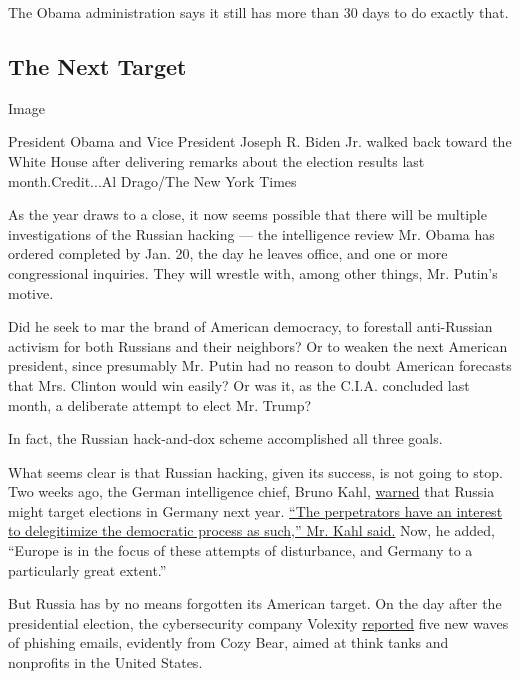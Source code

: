 The Obama administration says it still has more than 30 days to do
exactly that.

\hypertarget{the-next-target}{%
\subsection{The Next Target}\label{the-next-target}}

Image

President Obama and Vice President Joseph R. Biden Jr. walked back
toward the White House after delivering remarks about the election
results last month.Credit...Al Drago/The New York Times

As the year draws to a close, it now seems possible that there will be
multiple investigations of the Russian hacking --- the intelligence
review Mr. Obama has ordered completed by Jan. 20, the day he leaves
office, and one or more congressional inquiries. They will wrestle with,
among other things, Mr. Putin's motive.

Did he seek to mar the brand of American democracy, to forestall
anti-Russian activism for both Russians and their neighbors? Or to
weaken the next American president, since presumably Mr. Putin had no
reason to doubt American forecasts that Mrs. Clinton would win easily?
Or was it, as the C.I.A. concluded last month, a deliberate attempt to
elect Mr. Trump?

In fact, the Russian hack-and-dox scheme accomplished all three goals.

What seems clear is that Russian hacking, given its success, is not
going to stop. Two weeks ago, the German intelligence chief, Bruno Kahl,
\href{http://www.sueddeutsche.de/politik/bruno-kahl-im-interview-stoerversuche-aus-russland-1.3270241}{warned}
that Russia might target elections in Germany next year.
\href{http://www.nytimes.com/aponline/2016/11/29/world/europe/ap-eu-germany-cyberattacks.html}{``The
perpetrators have an interest to delegitimize the democratic process as
such,'' Mr. Kahl said.} Now, he added, ``Europe is in the focus of these
attempts of disturbance, and Germany to a particularly great extent.''

But Russia has by no means forgotten its American target. On the day
after the presidential election, the cybersecurity company Volexity
\href{https://www.volexity.com/blog/2016/11/09/powerduke-post-election-spear-phishing-campaigns-targeting-think-tanks-and-ngos/}{reported}
five new waves of phishing emails, evidently from Cozy Bear, aimed at
think tanks and nonprofits in the United States.

